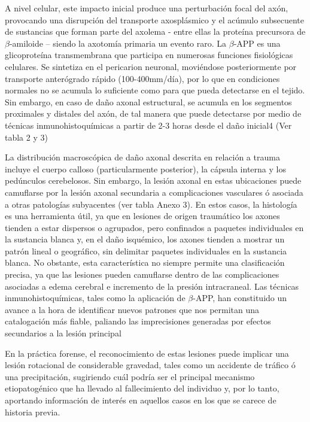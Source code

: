 A nivel celular, este impacto inicial produce una perturbación focal del axón, provocando una disrupción del transporte axosplásmico y el acúmulo subsecuente de sustancias que forman parte del axolema - entre ellas la proteína precursora de $\beta$-amiloide – siendo la axotomía primaria un evento raro. La $\beta$-APP es una glicoproteína transmembrana que participa en numerosas funciones fisiológicas celulares. Se sintetiza en el pericarion neuronal, moviéndose posteriormente por transporte anterógrado rápido (100-400mm/día), por lo que en condiciones normales no se acumula lo suficiente como para que pueda detectarse en el tejido. Sin embargo, en caso de daño axonal estructural, se acumula en los segmentos proximales y distales del axón, de tal manera que puede detectarse por medio de técnicas inmunohistoquímicas a partir de 2-3 horas desde el daño inicial4 (Ver tabla 2 y 3) \cite{Hostiuc2014}

La distribución macroscópica \cite{Reichard2005} de daño axonal descrita en relación a trauma incluye el cuerpo calloso (particularmente posterior), la cápsula interna y los pedúnculos cerebelosos. Sin embargo, la lesión axonal en estas ubicaciones puede camuflarse por la lesión axonal secundaria a complicaciones vasculares ó asociada a otras patologías subyacentes (ver tabla Anexo 3). En estos casos, la histología es una herramienta útil, ya que en lesiones de origen traumático los axones tienden a estar dispersos o agrupados, pero confinados a paquetes individuales en la sustancia blanca y, en el daño isquémico, los axones tienden a mostrar un patrón lineal o geográfico, sin delimitar paquetes individuales en la sustancia blanca. No obstante, esta característica no siempre permite una clasificación precisa, ya que las lesiones pueden camuflarse dentro de las complicaciones asociadas a edema cerebral e incremento de la presión intracraneal. Las técnicas inmunohistoquímicas, tales como la aplicación de $\beta$-APP, han constituido un avance a la hora de identificar nuevos patrones que nos permitan una catalogación más fiable, paliando las imprecisiones generadas por efectos secundarios a la lesión principal \cite{Geddes1997} \cite{Graham2004} \cite{Reichard2005} \cite{Traumatic}

En la práctica forense, el reconocimiento de estas lesiones puede implicar una lesión rotacional de considerable gravedad, tales como un accidente de tráfico ó una precipitación, sugiriendo cuál podría ser el principal mecanismo etiopatogénico que ha llevado al fallecimiento del individuo y, por lo tanto, aportando información de interés en aquellos casos en los que se carece de historia previa.

